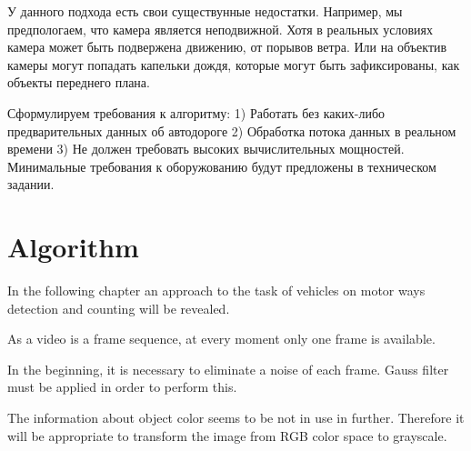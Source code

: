 \documentclass[12pt,a4paper,oneside,titlepage]{article}
\begin{document}
У данного подхода есть свои существунные недостатки.
Например, мы предпологаем, что камера является неподвижной.
Хотя в реальных условиях камера может быть подвержена движению, от порывов ветра.
Или на объектив камеры могут попадать капельки дождя, которые могут быть зафиксированы, как объекты переднего плана.





Сформулируем требования к алгоритму:
1) Работать без каких-либо предварительных данных об автодороге
2) Обработка потока данных в реальном времени
3) Не должен требовать высоких вычислительных мощностей. Минимальные требования к оборужованию будут предложены в техническом задании.
































\newpage
\section*{Algorithm}

In the following chapter an approach to the task of vehicles on motor ways detection and counting will be revealed.

As a video is a frame sequence, at every moment only one frame is available.

In the beginning, it is necessary to eliminate a noise of each frame.
Gauss filter must be applied in order to perform this.

The information about object color seems to be not in use in further.
Therefore it will be appropriate to transform the image from RGB color space to grayscale.
\end{document}
